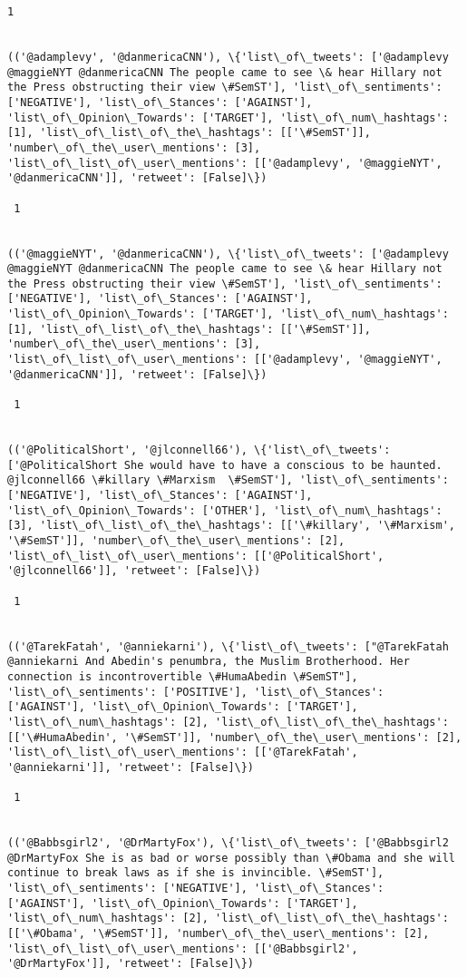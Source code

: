 \documentclass[11pt]{article}
\begin{document}
\begin{Verbatim}[commandchars=\\\{\}]
 1
 

(('@adamplevy', '@danmericaCNN'), \{'list\_of\_tweets': ['@adamplevy @maggieNYT @danmericaCNN The people came to see \& hear Hillary not the Press obstructing their view \#SemST'], 'list\_of\_sentiments': ['NEGATIVE'], 'list\_of\_Stances': ['AGAINST'], 'list\_of\_Opinion\_Towards': ['TARGET'], 'list\_of\_num\_hashtags': [1], 'list\_of\_list\_of\_the\_hashtags': [['\#SemST']], 'number\_of\_the\_user\_mentions': [3], 'list\_of\_list\_of\_user\_mentions': [['@adamplevy', '@maggieNYT', '@danmericaCNN']], 'retweet': [False]\})

 1
 

(('@maggieNYT', '@danmericaCNN'), \{'list\_of\_tweets': ['@adamplevy @maggieNYT @danmericaCNN The people came to see \& hear Hillary not the Press obstructing their view \#SemST'], 'list\_of\_sentiments': ['NEGATIVE'], 'list\_of\_Stances': ['AGAINST'], 'list\_of\_Opinion\_Towards': ['TARGET'], 'list\_of\_num\_hashtags': [1], 'list\_of\_list\_of\_the\_hashtags': [['\#SemST']], 'number\_of\_the\_user\_mentions': [3], 'list\_of\_list\_of\_user\_mentions': [['@adamplevy', '@maggieNYT', '@danmericaCNN']], 'retweet': [False]\})

 1
 

(('@PoliticalShort', '@jlconnell66'), \{'list\_of\_tweets': ['@PoliticalShort She would have to have a conscious to be haunted. @jlconnell66 \#killary \#Marxism  \#SemST'], 'list\_of\_sentiments': ['NEGATIVE'], 'list\_of\_Stances': ['AGAINST'], 'list\_of\_Opinion\_Towards': ['OTHER'], 'list\_of\_num\_hashtags': [3], 'list\_of\_list\_of\_the\_hashtags': [['\#killary', '\#Marxism', '\#SemST']], 'number\_of\_the\_user\_mentions': [2], 'list\_of\_list\_of\_user\_mentions': [['@PoliticalShort', '@jlconnell66']], 'retweet': [False]\})

 1
 

(('@TarekFatah', '@anniekarni'), \{'list\_of\_tweets': ["@TarekFatah @anniekarni And Abedin's penumbra, the Muslim Brotherhood. Her connection is incontrovertible \#HumaAbedin \#SemST"], 'list\_of\_sentiments': ['POSITIVE'], 'list\_of\_Stances': ['AGAINST'], 'list\_of\_Opinion\_Towards': ['TARGET'], 'list\_of\_num\_hashtags': [2], 'list\_of\_list\_of\_the\_hashtags': [['\#HumaAbedin', '\#SemST']], 'number\_of\_the\_user\_mentions': [2], 'list\_of\_list\_of\_user\_mentions': [['@TarekFatah', '@anniekarni']], 'retweet': [False]\})

 1
 

(('@Babbsgirl2', '@DrMartyFox'), \{'list\_of\_tweets': ['@Babbsgirl2 @DrMartyFox She is as bad or worse possibly than \#Obama and she will continue to break laws as if she is invincible. \#SemST'], 'list\_of\_sentiments': ['NEGATIVE'], 'list\_of\_Stances': ['AGAINST'], 'list\_of\_Opinion\_Towards': ['TARGET'], 'list\_of\_num\_hashtags': [2], 'list\_of\_list\_of\_the\_hashtags': [['\#Obama', '\#SemST']], 'number\_of\_the\_user\_mentions': [2], 'list\_of\_list\_of\_user\_mentions': [['@Babbsgirl2', '@DrMartyFox']], 'retweet': [False]\})


\end{Verbatim}
\end{document}
